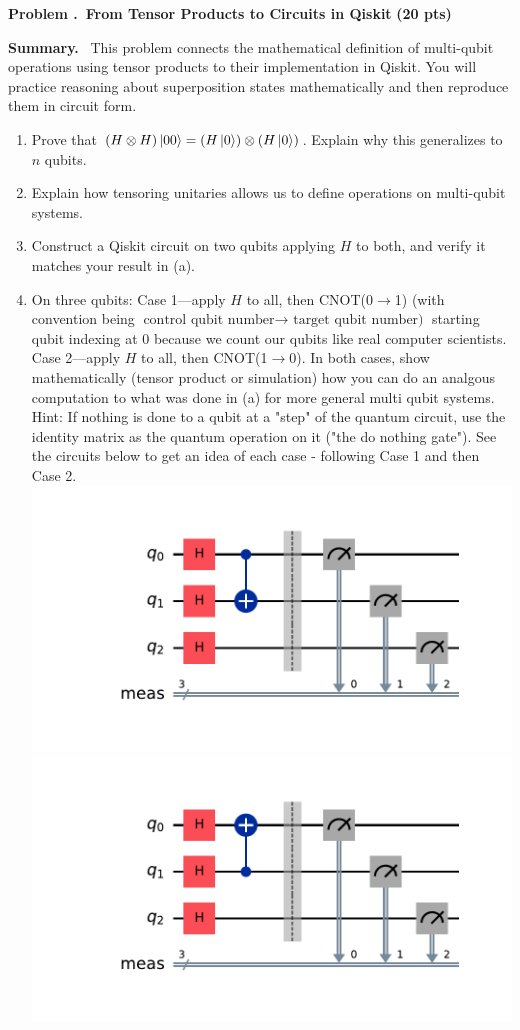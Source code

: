 \documentclass[11pt]{article}
\newcommand{\pts}[1]{\hfill{\small\bfseries(#1 pts)}}
\newenvironment{summary}{\vspace{2pt}\noindent\textbf{Summary.}~}{\par\vspace{6pt}}
\newcounter{problem}
\newcommand{\problem}[2]{%
  \refstepcounter{problem}
  \vspace{10pt}\noindent\textbf{Problem \theproblem.~#1} \pts{#2}\par
}
\begin{document}
\problem{From Tensor Products to Circuits in Qiskit}{20}
\begin{summary}
This problem connects the mathematical definition of multi-qubit operations using tensor products to their implementation in Qiskit. You will practice reasoning about superposition states mathematically and then reproduce them in circuit form.
\end{summary}

\begin{enumerate}[label=(\alph*)]
  \item Prove that $(H\otimes H)\ket{00} = (H\ket{0})\otimes(H\ket{0})$. Explain why this generalizes to $n$ qubits.
  \item Explain how tensoring unitaries allows us to define operations on multi-qubit systems.
  \item Construct a Qiskit circuit on two qubits applying $H$ to both, and verify it matches your result in (a).
  \item On three qubits: Case 1—apply $H$ to all, then CNOT(0$\to$1) \newline (with convention being $\text{control qubit number} \to \text{ target qubit number)}$ starting qubit indexing at 0 because we count our qubits like real computer scientists. Case 2—apply $H$ to all, then CNOT(1$\to$0).  
  In both cases, show mathematically (tensor product or simulation) how you can do an analgous computation to what was done in (a) for more general multi qubit systems. Hint: If nothing is done to a qubit at a "step" of the quantum circuit, use the identity matrix as the quantum operation on it ("the do nothing gate"). See the circuits below to get an idea of each case - following Case 1 and then Case 2.
  \includegraphics[]{qc_case1.pdf}
  \includegraphics[]{qc_case2.pdf}
\end{enumerate}
\end{document}
